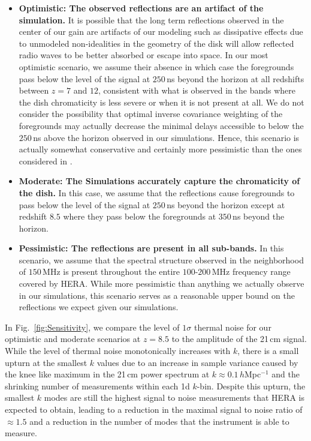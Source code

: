\documentclass[twocolumn]{emulateapj}
\begin{document}
\begin{itemize}
\item {\bf Optimistic: The observed reflections are an artifact of the simulation.} It is possible that the long term reflections observed in the center of our gain are artifacts of our modeling such as dissipative effects due to unmodeled non-idealities in the geometry of the disk will allow reflected radio waves to be better absorbed or escape into space. In our most optimistic scenario, we assume their absence in which case the foregrounds pass below the level of the signal at $250$\,ns beyond the horizon at all redshifts between $z=7$ and $12$, consistent with what is observed in the bands where the dish chromaticity is less severe or when it is not present at all. We do not consider the possibility that optimal inverse covariance weighting of the foregrounds  may actually decrease the minimal delays accessible to below the $250$\,ns above the horizon observed in our simulations. Hence, this scenario is actually somewhat conservative and certainly more pessimistic than the ones considered in \citet{Pober:2014,Liu:2015a,Liu:2015b,EwallWice:2015b}. 
 
\item {\bf Moderate: The Simulations accurately capture the chromaticity of the dish.} In this case, we assume that the reflections cause foregrounds to pass below the level of the signal at $250$\,ns beyond the horizon except at redshift $8.5$ where they pass below the foregrounds at $350$\,ns beyond the horizon. 


\item {\bf Pessimistic: The reflections are present in all sub-bands.} In this scenario, we assume that the spectral structure observed in the neighborhood of $150$\,MHz is present throughout the entire $100$-$200$\,MHz frequency range covered by HERA. While more pessimistic than anything we actually observe in our simulations, this scenario serves as a reasonable upper bound on the reflections we expect given our simulations.
 
\end{itemize}
In Fig.~\ref{fig:Sensitivity}, we compare the level of $1\sigma$ thermal noise for our optimistic and moderate scenarios at $z=8.5$ to the amplitude of the 21\,cm signal. While the level of thermal noise monotonically increases with $k$, there is a small upturn at the smallest $k$ values due to an increase in sample variance caused by the knee like maximum in the 21\,cm power spectrum at $k \approx 0.1$\,$h$Mpc$^{-1}$ and the shrinking number of measurements within each 1d $k$-bin. Despite this upturn, the smallest $k$ modes are still the highest signal to noise measurements that HERA is expected to obtain, leading to a reduction in the maximal signal to noise ratio of $\approx 1.5$ and a reduction in the number of modes that the instrument is able to measure. 
\end{document}
